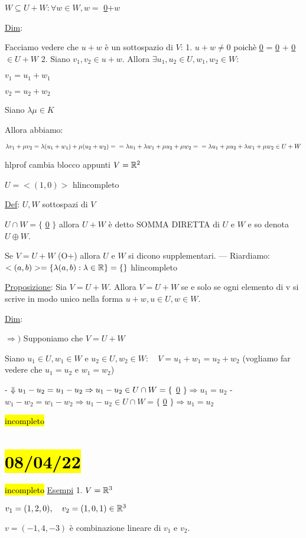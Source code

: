 \documentclass{article}
\begin{document}
  $W\subseteq U+W:\forall w\in W,w=$ \ul{0}$+w$

\ul{Dim}:

Facciamo vedere che $u+w$ è un sottospazio di $V$:
1. $u+w\not=0$ poichè \ul{0} = \ul{0} $+$ \ul{0} $\in U+W$
2. Siano $v_1,v_2\in u+w$. Allora $\exists u_1,u_2\in U,w_1,w_2\in W:$

   $v_1=u_1+w_1$

   $v_2=u_2+w_2$

   Siano $\lambda\mu\in K$

   Allora abbiamo:

   $\lambda v_1+\mu v_2=\lambda(u_1+w_1)+\mu(u_2+w_2)=\\=\lambda u_1+\lambda w_1+\mu u_2 + \mu w_2
   =\\=\lambda u_1+\mu u_2+\lambda w_1+\mu w_2\in U+W$

hl{prof cambia blocco appunti}
$V=\mathbb{R}^2$

$U=<(1,0)>$
hl{incompleto}

\ul{Def}: $U,W$ sottospazi di $V$

$U\cap W=\{$ \ul{0} $\}$ allora $U+W$ è detto SOMMA DIRETTA di $U$ e $W$ e so denota $U\oplus W$.

Se $V=U+W$ (O+) allora $U$ e $W$ si dicono supplementari.
---
Riardiamo: $<(a,b)>=\{\lambda(a,b):\lambda\in\mathbb{R}\}=\{\}$
hl{incompleto}

\ul{Proposizione}: Sia $V=U+W$. Allora $V=U+W$ se e solo se ogni elemento di v si scrive in modo unico nella forma $u+w, u\in U, w\in W$.

\ul{Dim}:

$\Rightarrow)$ Supponiamo che $V=U+W$

Siano $u_1\in U,w_1\in W$ e $u_2\in U,w_2\in W:\quad V=u_1+w_1=u_2+w_2$ (vogliamo far vedere che $u_1=u_2$ e $w_1=w_2$)

- $\Downarrow\\u_1-u_2=u_1-u_2\Rightarrow u_1-u_2\in U\cap W=\{$ \ul{0} $\}\Rightarrow u_1=u_2$
- $w_1-w_2=w_1-w_2\Rightarrow u_1-u_2\in U\cap W=\{$ \ul{0} $\}\Rightarrow u_1=u_2$

\hl{incompleto}
\section{\hl{08/04/22}}
\hl{incompleto}
\ul{Esempi}
1. $V=\mathbb{R}^3$

   $v_1=(1,2,0),\quad v_2=(1,0,1)\in\mathbb{R}^3$

   $v=(-1,4,-3)$ è combinazione lineare di $v_1$ e $v_2$.
\end{document}
